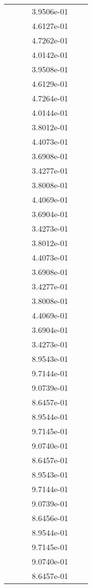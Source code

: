 \begin{xltabular}{\textwidth}{r|rS[table-format=1.3e+2]S[table-format=1.4e+2]S[table-format=1.4e+2]S[table-format=-1.5]}
&  &  & 3.9506e-01 & & \\
&  &  & 4.6127e-01 & & \\
&  &  & 4.7262e-01 & & \\
&  &  & 4.0142e-01 & & \\
&  &  & 3.9508e-01 & & \\
&  &  & 4.6129e-01 & & \\
&  &  & 4.7264e-01 & & \\
&  &  & 4.0144e-01 & & \\
&  &  & 3.8012e-01 & & \\
&  &  & 4.4073e-01 & & \\
&  &  & 3.6908e-01 & & \\
&  &  & 3.4277e-01 & & \\
&  &  & 3.8008e-01 & & \\
&  &  & 4.4069e-01 & & \\
&  &  & 3.6904e-01 & & \\
&  &  & 3.4273e-01 & & \\
&  &  & 3.8012e-01 & & \\
&  &  & 4.4073e-01 & & \\
&  &  & 3.6908e-01 & & \\
&  &  & 3.4277e-01 & & \\
&  &  & 3.8008e-01 & & \\
&  &  & 4.4069e-01 & & \\
&  &  & 3.6904e-01 & & \\
&  &  & 3.4273e-01 & & \\
&  &  & 8.9543e-01 & & \\
&  &  & 9.7144e-01 & & \\
&  &  & 9.0739e-01 & & \\
&  &  & 8.6457e-01 & & \\
&  &  & 8.9544e-01 & & \\
&  &  & 9.7145e-01 & & \\
&  &  & 9.0740e-01 & & \\
&  &  & 8.6457e-01 & & \\
&  &  & 8.9543e-01 & & \\
&  &  & 9.7144e-01 & & \\
&  &  & 9.0739e-01 & & \\
&  &  & 8.6456e-01 & & \\
&  &  & 8.9544e-01 & & \\
&  &  & 9.7145e-01 & & \\
&  &  & 9.0740e-01 & & \\
&  &  & 8.6457e-01 & & \\

\end{xltabular}
